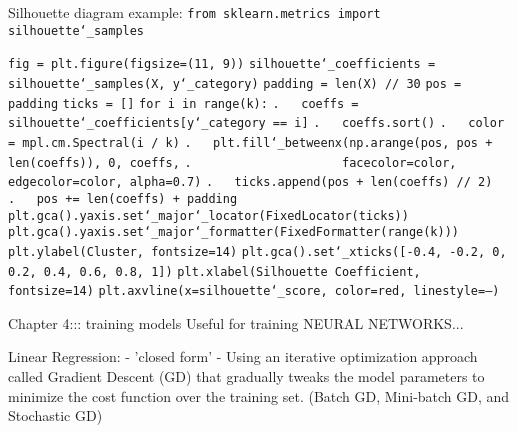 \newpage
Silhouette diagram example:\newline
\texttt{from sklearn.metrics import silhouette\char`_samples}

\texttt{fig = plt.figure(figsize=(11, 9))}\newline
\texttt{silhouette\char`_coefficients = silhouette\char`_samples(X, y\char`_category)}\newline
\texttt{padding = len(X) // 30}\newline
\texttt{pos = padding}\newline
\texttt{ticks = []}\newline
\texttt{for i in range(k):}\newline
\texttt{.~~~coeffs = silhouette\char`_coefficients[y\char`_category == i]}\newline
\texttt{.~~~coeffs.sort()}\newline
\texttt{.~~~color = mpl.cm.Spectral(i / k)}\newline
\texttt{.~~~plt.fill\char`_betweenx(np.arange(pos, pos + len(coeffs)), 0, coeffs,}\newline
\texttt{.~~~~~~~~~~~~~~~~~~~~~facecolor=color, edgecolor=color, alpha=0.7)}\newline
\texttt{.~~~ticks.append(pos + len(coeffs) // 2)}\newline
\texttt{.~~~pos += len(coeffs) + padding}\newline
\texttt{plt.gca().yaxis.set\char`_major\char`_locator(FixedLocator(ticks))}\newline
\texttt{plt.gca().yaxis.set\char`_major\char`_formatter(FixedFormatter(range(k)))}\newline
\texttt{plt.ylabel(\textquotesingle Cluster\textquotesingle , fontsize=14)}\newline
\texttt{plt.gca().set\char`_xticks([-0.4, -0.2, 0, 0.2, 0.4, 0.6, 0.8, 1])}\newline
\texttt{plt.xlabel(\textquotesingle Silhouette Coefficient\textquotesingle , fontsize=14)}\newline
\texttt{plt.axvline(x=silhouette\char`_score, color=\textquotesingle red\textquotesingle , linestyle=\textquotesingle --\textquotesingle )}\newline






Chapter 4::: training models
Useful for training NEURAL NETWORKS...

Linear Regression:
- 'closed form'
-
Using an iterative optimization approach called Gradient Descent (GD)
that gradually tweaks the model parameters to minimize the cost function over the training set.
(Batch GD, Mini-batch GD, and Stochastic GD)

